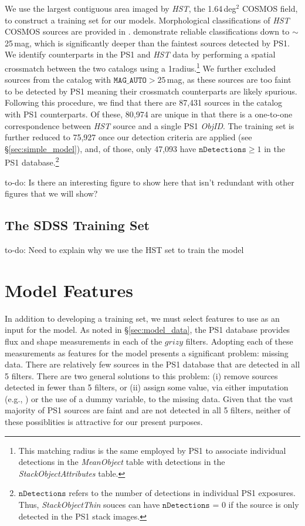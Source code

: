 \documentclass[twocolumn]{aastex62}
\newcommand{\todo}[1]{{\color{magenta} to-do: {#1}}}
\begin{document}
We use the largest contiguous area imaged by \textit{HST}, the 1.64\,deg$^2$
COSMOS field, to construct a training set for our models. Morphological
classifications of \textit{HST} COSMOS sources are provided in
\citet{Leauthaud07}. \citeauthor{Leauthaud07} demonstrate reliable
classifications down to $\sim$25\,mag, which is significantly deeper than the
faintest sources detected by PS1. We identify counterparts in the PS1 and
\textit{HST} data by performing a spatial crossmatch between the two catalogs
using a 1\arcsec radius.\footnote{This matching radius is the same employed by
PS1 to associate individual detections in the \textit{MeanObject} table with
detections in the \textit{StackObjectAttributes} table.} We further excluded
sources from the \citet{Leauthaud07} catalog with $\texttt{MAG\_AUTO} >
25$\,mag, as these sources are too faint to be detected by PS1 meaning their
crossmatch counterparts are likely spurious. Following this procedure, we find
that there are 87,431 sources in the \citet{Leauthaud07} catalog with PS1
counterparts. Of these, 80,974 are unique in that there is a one-to-one
correspondence between \textit{HST} source and a single PS1 \textit{ObjID}. The
training set is further reduced to 75,927 once our detection criteria are
applied (see \S\ref{sec:simple_model}), and, of those, only 47,093 have
$\texttt{nDetections} \ge 1$ in the PS1
database.\footnote{$\texttt{nDetections}$ refers to the number of detections in
individual PS1 exposures. Thus, \textit{StackObjectThin} souces can have
$\texttt{nDetections}$ = 0 if the source is only detected in the PS1 stack
images.}

\todo{Is there an interesting figure to show here that isn't redundant with other figures that we will show?}

\subsection{The SDSS Training Set}\label{sec:sdss}

\todo{Need to explain why we use the HST set to train the model}

\section{Model Features}\label{sec:model_features}

In addition to developing a training set, we must select features to use as an input for the model. As noted in \S\ref{sec:model_data}, the PS1 database provides flux and shape measurements in each of the $grizy$ filters. Adopting each of these measurements as features for the model presents a significant problem: missing data. There are relatively few sources in the PS1 database that are detected in all 5 filters. There are two general solutions to this problem: (i) remove sources detected in fewer than 5 filters, or (ii) assign some value, via either imputation (e.g., \citealt{Miller17}) or the use of a dummy variable, to the missing data. Given that the vast majority of PS1 sources are faint and are not detected in all 5 filters, neither of these possiblities is attractive for our present purposes.
\end{document}
